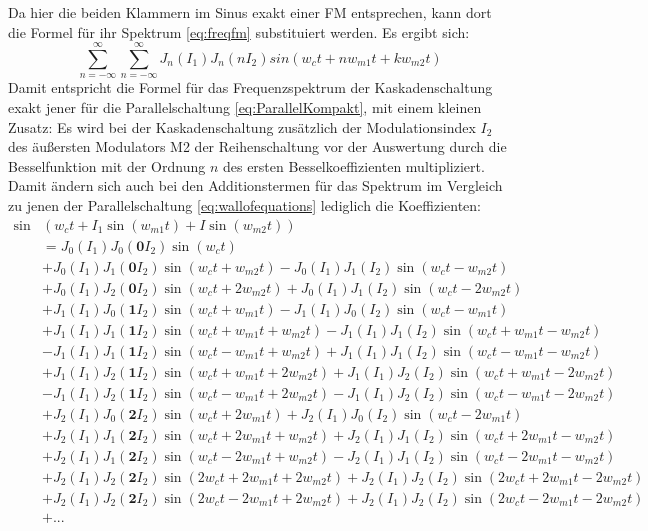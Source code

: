 Da hier die beiden Klammern im Sinus exakt einer FM entsprechen, kann dort die Formel für ihr Spektrum \ref{eq:freqfm} substituiert werden. Es ergibt sich:
\begin{equation}
\sum_{n=-\infty}^{\infty}\sum_{n=-\infty}^{\infty}J_n(I_1)J_n(nI_2)sin(w_{c}t+nw_{m1}t + kw_{m2}t)
\end{equation}
Damit entspricht die Formel für das Frequenzspektrum der Kaskadenschaltung exakt jener für die Parallelschaltung \ref{eq:ParallelKompakt}, mit einem kleinen Zusatz: Es wird bei der Kaskadenschaltung zusätzlich der Modulationsindex $ I_2 $ des äußersten Modulators M2 der Reihenschaltung vor der Auswertung durch die Besselfunktion mit der Ordnung $ n $ des ersten Besselkoeffizienten multipliziert. Damit ändern sich auch bei den Additionstermen für das Spektrum im Vergleich zu jenen der Parallelschaltung \ref{eq:wallofequations} lediglich die Koeffizienten:
\begin{equation}
\begin{split}
\sin&(w_ct + I_1\sin(w_{m1}t) + I\sin(w_{m2}t)) \\
&= J_0(I_1)J_0(\mathbf{0}I_2)\sin(w_ct) \\
&+ J_0(I_1)J_1(\mathbf{0}I_2)\sin(w_ct + w_{m2}t) - J_0(I_1)J_1(I_2)\sin(w_ct - w_{m2}t) \\
&+ J_0(I_1)J_2(\mathbf{0}I_2)\sin(w_ct + 2w_{m2}t) + J_0(I_1)J_1(I_2)\sin(w_ct - 2w_{m2}t) \\
&+ J_1(I_1)J_0(\mathbf{1}I_2)\sin(w_ct + w_{m1}t) - J_1(I_1)J_0(I_2)\sin(w_ct - w_{m1}t) \\
&+ J_1(I_1)J_1(\mathbf{1}I_2)\sin(w_ct + w_{m1}t + w_{m2}t) - J_1(I_1)J_1(I_2)\sin(w_ct + w_{m1}t - w_{m2}t) \\
&- J_1(I_1)J_1(\mathbf{1}I_2)\sin(w_ct - w_{m1}t + w_{m2}t) + J_1(I_1)J_1(I_2)\sin(w_ct - w_{m1}t - w_{m2}t) \\
&+ J_1(I_1)J_2(\mathbf{1}I_2)\sin(w_ct + w_{m1}t + 2w_{m2}t) + J_1(I_1)J_2(I_2)\sin(w_ct + w_{m1}t - 2w_{m2}t) \\
&- J_1(I_1)J_2(\mathbf{1}I_2)\sin(w_ct - w_{m1}t + 2w_{m2}t) - J_1(I_1)J_2(I_2)\sin(w_ct - w_{m1}t - 2w_{m2}t) \\
&+ J_2(I_1)J_0(\mathbf{2}I_2)\sin(w_ct + 2w_{m1}t) + J_2(I_1)J_0(I_2)\sin(w_ct - 2w_{m1}t) \\
&+ J_2(I_1)J_1(\mathbf{2}I_2)\sin(w_ct + 2w_{m1}t + w_{m2}t) + J_2(I_1)J_1(I_2)\sin(w_ct + 2w_{m1}t - w_{m2}t) \\
&+ J_2(I_1)J_1(\mathbf{2}I_2)\sin(w_ct - 2w_{m1}t + w_{m2}t) - J_2(I_1)J_1(I_2)\sin(w_ct - 2w_{m1}t - w_{m2}t) \\
&+ J_2(I_1)J_2(\mathbf{2}I_2)\sin(2w_ct + 2w_{m1}t + 2w_{m2}t) + J_2(I_1)J_2(I_2)\sin(2w_ct + 2w_{m1}t - 2w_{m2}t) \\
&+ J_2(I_1)J_2(\mathbf{2}I_2)\sin(2w_ct - 2w_{m1}t + 2w_{m2}t) + J_2(I_1)J_2(I_2)\sin(2w_ct - 2w_{m1}t - 2w_{m2}t) \\
&+ ... 
\end{split}
\end{equation}
